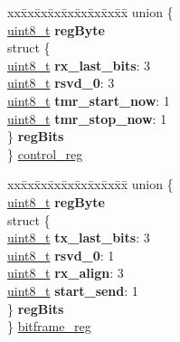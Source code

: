 \begin{DoxyCompactItemize}
\begin{tabbing}
\end{tabbing}\item 
\begin{tabbing}
xx\=xx\=xx\=xx\=xx\=xx\=xx\=xx\=xx\=\kill
union \{\\
\>\hyperlink{vl53l0x__types_8h_aba7bc1797add20fe3efdf37ced1182c5}{uint8\_t} {\bfseries regByte}\\
\>struct \{\\
\>\>\hyperlink{vl53l0x__types_8h_aba7bc1797add20fe3efdf37ced1182c5}{uint8\_t} {\bfseries rx\_last\_bits}: 3\\
\>\>\hyperlink{vl53l0x__types_8h_aba7bc1797add20fe3efdf37ced1182c5}{uint8\_t} {\bfseries rsvd\_0}: 3\\
\>\>\hyperlink{vl53l0x__types_8h_aba7bc1797add20fe3efdf37ced1182c5}{uint8\_t} {\bfseries tmr\_start\_now}: 1\\
\>\>\hyperlink{vl53l0x__types_8h_aba7bc1797add20fe3efdf37ced1182c5}{uint8\_t} {\bfseries tmr\_stop\_now}: 1\\
\>\} {\bfseries regBits}\\
\} \hyperlink{structstruct_a721f276d7231c2e85a8fd2c78e554de4}{control\_reg}\\

\end{tabbing}\item 
\begin{tabbing}
xx\=xx\=xx\=xx\=xx\=xx\=xx\=xx\=xx\=\kill
union \{\\
\>\hyperlink{vl53l0x__types_8h_aba7bc1797add20fe3efdf37ced1182c5}{uint8\_t} {\bfseries regByte}\\
\>struct \{\\
\>\>\hyperlink{vl53l0x__types_8h_aba7bc1797add20fe3efdf37ced1182c5}{uint8\_t} {\bfseries tx\_last\_bits}: 3\\
\>\>\hyperlink{vl53l0x__types_8h_aba7bc1797add20fe3efdf37ced1182c5}{uint8\_t} {\bfseries rsvd\_0}: 1\\
\>\>\hyperlink{vl53l0x__types_8h_aba7bc1797add20fe3efdf37ced1182c5}{uint8\_t} {\bfseries rx\_align}: 3\\
\>\>\hyperlink{vl53l0x__types_8h_aba7bc1797add20fe3efdf37ced1182c5}{uint8\_t} {\bfseries start\_send}: 1\\
\>\} {\bfseries regBits}\\
\} \hyperlink{structstruct_a875453616cf061da36e0ed90d46d380c}{bitframe\_reg}\\


\end{tabbing}
\end{DoxyCompactItemize}
